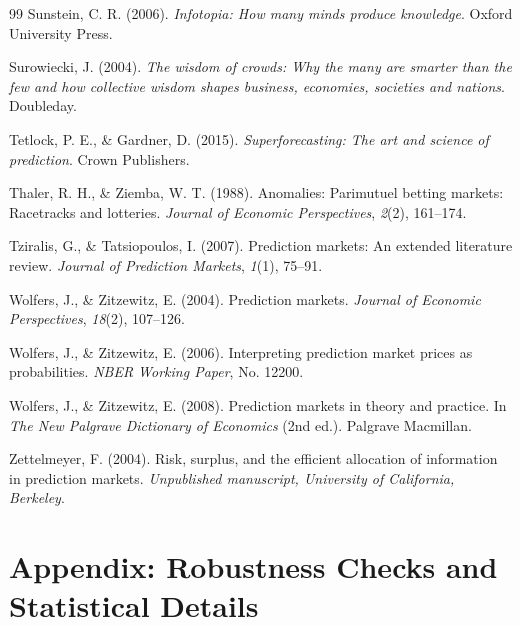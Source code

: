 \documentclass[12pt,letterpaper]{article}
\begin{document}
\begin{thebibliography}{99}
Sunstein, C. R. (2006).
\newblock \textit{Infotopia: How many minds produce knowledge}.
\newblock Oxford University Press.

Surowiecki, J. (2004).
\newblock \textit{The wisdom of crowds: Why the many are smarter than the few and how collective wisdom shapes business, economies, societies and nations}.
\newblock Doubleday.

Tetlock, P. E., \& Gardner, D. (2015).
\newblock \textit{Superforecasting: The art and science of prediction}.
\newblock Crown Publishers.

Thaler, R. H., \& Ziemba, W. T. (1988).
\newblock Anomalies: Parimutuel betting markets: Racetracks and lotteries.
\newblock \textit{Journal of Economic Perspectives}, \textit{2}(2), 161--174.

Tziralis, G., \& Tatsiopoulos, I. (2007).
\newblock Prediction markets: An extended literature review.
\newblock \textit{Journal of Prediction Markets}, \textit{1}(1), 75--91.

Wolfers, J., \& Zitzewitz, E. (2004).
\newblock Prediction markets.
\newblock \textit{Journal of Economic Perspectives}, \textit{18}(2), 107--126.

Wolfers, J., \& Zitzewitz, E. (2006).
\newblock Interpreting prediction market prices as probabilities.
\newblock \textit{NBER Working Paper}, No. 12200.

Wolfers, J., \& Zitzewitz, E. (2008).
\newblock Prediction markets in theory and practice.
\newblock In \textit{The New Palgrave Dictionary of Economics} (2nd ed.).
\newblock Palgrave Macmillan.

Zettelmeyer, F. (2004).
\newblock Risk, surplus, and the efficient allocation of information in prediction markets.
\newblock \textit{Unpublished manuscript, University of California, Berkeley}.

\end{thebibliography}

\clearpage
\appendix
\section{Appendix: Robustness Checks and Statistical Details}\label{sec:appendix}
\end{document}
